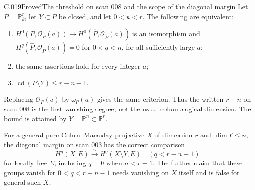 \begin{saresult}{C.019}{Proved}{The threshold on scan 008 and the scope of the diagonal margin}
Let $P=\mathbb P^r_k$, let $Y\subset P$ be closed, and let
$0<n<r$. The following are equivalent:
\begin{enumerate}
\item $H^0(P,\mathcal O_P(a))\to
H^0(\widehat P,\mathcal O_{\widehat P}(a))$ is an isomorphism and
$H^q(\widehat P,\mathcal O_{\widehat P}(a))=0$ for $0<q<n$,
for all sufficiently large $a$;
\item the same assertions hold for every integer $a$;
\item $\operatorname{cd}(P\setminus Y)\leq r-n-1$.
\end{enumerate}
Replacing $\mathcal O_P(a)$ by $\omega_P(a)$ gives the same criterion.
Thus the written $r-n$ on scan 008 is the first vanishing degree,
not the usual cohomological dimension. The bound is attained by
$Y=\mathbb P^n\subset\mathbb P^r$.

For a general pure Cohen--Macaulay projective $X$ of dimension $r$
and $\dim Y\leq n$, the diagonal margin on scan 003 has the correct
comparison
\[
 H^q(X,E)\xrightarrow{\sim}H^q(X\setminus Y,E)
       \quad(q<r-n-1)
 \tag{C.19.1}
\]
for locally free $E$, including $q=0$ when $n<r-1$.
The further claim that these groups vanish for $0<q<r-n-1$
needs vanishing on $X$ itself and is false for general such $X$.
\end{saresult}
